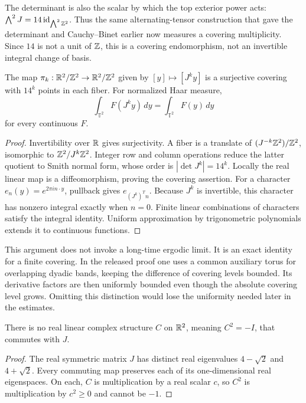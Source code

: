 The determinant is also the scalar by which the top exterior power acts:
$\bigwedge^2J=14\operatorname{id}_{\bigwedge^2\mathbb{Z}^2}$. Thus the same alternating-tensor construction that gave the determinant and Cauchy--Binet earlier now measures a covering multiplicity. Since $14$ is not a unit of $\mathbb{Z}$, this is a covering endomorphism, not an invertible integral change of basis.

\begin{proposition}
\label{prop:fluid-covering}
The map $\pi_k:\mathbb{R}^2/\mathbb{Z}^2\to\mathbb{R}^2/\mathbb{Z}^2$ given by $[y]\mapsto[J^ky]$ is a surjective covering with $14^k$ points in each fiber. For normalized Haar measure,
\[
 \int_{\mathbb T^2}F(J^ky)\,dy=\int_{\mathbb T^2}F(y)\,dy
\]
for every continuous $F$.
\end{proposition}
\begin{proof}
Invertibility over $\mathbb{R}$ gives surjectivity. A fiber is a translate of
$(J^{-k}\mathbb{Z}^2)/\mathbb{Z}^2$, isomorphic to $\mathbb{Z}^2/J^k\mathbb{Z}^2$. Integer row and column operations reduce the latter quotient to Smith normal form, whose order is $|\det J^k|=14^k$. Locally the real linear map is a diffeomorphism, proving the covering assertion. For a character $e_n(y)=e^{2\pi i n\cdot y}$, pullback gives $e_{(J^k)^Tn}$. Because $J^k$ is invertible, this character has nonzero integral exactly when $n=0$. Finite linear combinations of characters satisfy the integral identity. Uniform approximation by trigonometric polynomials extends it to continuous functions.
\end{proof}

This argument does not invoke a long-time ergodic limit. It is an exact identity for a finite covering. In the released proof one uses a common auxiliary torus for overlapping dyadic bands, keeping the difference of covering levels bounded. Its derivative factors are then uniformly bounded even though the absolute covering level grows. Omitting this distinction would lose the uniformity needed later in the estimates.

\begin{proposition}
\label{prop:fluid-no-complex}
There is no real linear complex structure $C$ on $\mathbb{R}^2$, meaning $C^2=-I$, that commutes with $J$.
\end{proposition}
\begin{proof}
The real symmetric matrix $J$ has distinct real eigenvalues $4-\sqrt2$ and $4+\sqrt2$. Every commuting map preserves each of its one-dimensional real eigenspaces. On each, $C$ is multiplication by a real scalar $c$, so $C^2$ is multiplication by $c^2\ge0$ and cannot be $-1$.
\end{proof}


